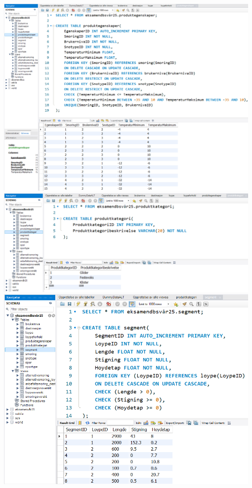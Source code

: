 \documentclass[12pt, a4paper]{article}
\begin{document}
\includegraphics[width=\textwidth]{produktegenskaper.png}
\includegraphics[width=\textwidth]{produktkategori.png}
\includegraphics[width=\textwidth]{segment.png}
\end{document}

